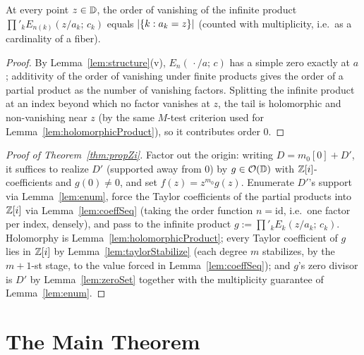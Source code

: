 \begin{lemma}
  \label{lem:zeroSet}
  \leanok
  At every point $z \in \mathbb{D}$, the order of vanishing of the infinite
  product $\prod'_k E_{n(k)}(z/a_k;\,c_k)$ equals $\left|\{k : a_k = z\}\right|$
  (counted with multiplicity, i.e.\ as a cardinality of a fiber).
\end{lemma}
\begin{proof}
  \leanok
  By Lemma~\ref{lem:structure}(v), $E_n(\,\cdot/a;\,c)$ has a simple zero
  exactly at $a$; additivity of the order of vanishing under finite
  products gives the order of a partial product as the number of
  vanishing factors. Splitting the infinite product at an index beyond
  which no factor vanishes at $z$, the tail is holomorphic and
  non-vanishing near $z$ (by the same $M$-test criterion used for
  Lemma~\ref{lem:holomorphicProduct}), so it contributes order $0$.
\end{proof}

\begin{proof}[Proof of Theorem~\ref{thm:propZi}]
  \leanok
  Factor out the origin: writing $D = m_0[0] + D'$, it suffices to
  realize $D'$ (supported away from $0$) by $g \in \mathcal{O}(\mathbb{D})$ with
  $\mathbb{Z}[i]$-coefficients and $g(0) \ne 0$, and set $f(z) = z^{m_0}g(z)$.
  Enumerate $D'$'s support via Lemma~\ref{lem:enum}, force the Taylor
  coefficients of the partial products into $\mathbb{Z}[i]$ via
  Lemma~\ref{lem:coeffSeq} (taking the order function $n = \mathrm{id}$,
  i.e.\ one factor per index, densely), and pass to the infinite
  product $g := \prod'_k E_k(z/a_k;\,c_k)$. Holomorphy is
  Lemma~\ref{lem:holomorphicProduct}; every Taylor coefficient of $g$
  lies in $\mathbb{Z}[i]$ by Lemma~\ref{lem:taylorStabilize} (each degree $m$
  stabilizes, by the $m+1$-st stage, to the value forced in
  Lemma~\ref{lem:coeffSeq}); and $g$'s zero divisor is $D'$ by
  Lemma~\ref{lem:zeroSet} together with the multiplicity guarantee of
  Lemma~\ref{lem:enum}.
\end{proof}

\chapter{The Main Theorem}
\label{chap:main}

